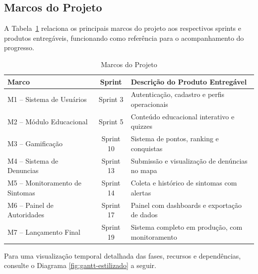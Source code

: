\documentclass[a4paper, 12pt]{article}
\begin{document}
\subsection{Marcos do Projeto}
\label{sec:marcos}

A Tabela~\ref{tab:marcos} relaciona os principais marcos do projeto aos respectivos sprints e produtos entregáveis, funcionando como referência para o acompanhamento do progresso.

\begin{table}[h]
\centering
\caption{Marcos do Projeto}
\label{tab:marcos}
\begin{tabular}{|l|c|l|}
\hline
\textbf{Marco} & \textbf{Sprint} & \textbf{Descrição do Produto Entregável} \\
\hline
M1 – Sistema de Usuários & Sprint 3 & Autenticação, cadastro e perfis operacionais \\
M2 – Módulo Educacional & Sprint 5 & Conteúdo educacional interativo e quizzes \\
M3 – Gamificação & Sprint 10 & Sistema de pontos, ranking e conquistas \\
M4 – Sistema de Denuncias & Sprint 13 & Submissão e visualização de denúncias no mapa \\
M5 – Monitoramento de Sintomas & Sprint 14 & Coleta e histórico de sintomas com alertas \\
M6 – Painel de Autoridades & Sprint 17 & Painel com dashboards e exportação de dados \\
M7 – Lançamento Final & Sprint 19 & Sistema completo em produção, com monitoramento \\
\hline
\end{tabular}
\end{table}

\noindent Para uma visualização temporal detalhada das fases, recursos e dependências, consulte o Diagrama \ref{fig:gantt-estilizado} a seguir.

\end{document}
